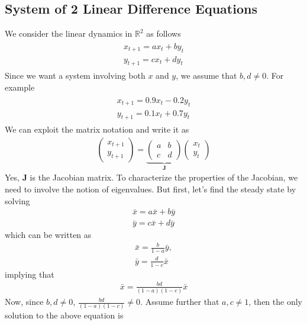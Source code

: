 \documentclass[11pt,a4paper]{book}
\theoremstyle{definition}\newtheorem{definition}{Definition}
\theoremstyle{definition}\newtheorem{fact}{Fact}
\theoremstyle{definition}\newtheorem{remark}{Remark}
\theoremstyle{definition}\newtheorem{ex}{Ex.}
\theoremstyle{definition}\newtheorem{project}{Project}
\theoremstyle{definition}\newtheorem{problem}{Problem}
\theoremstyle{definition}\newtheorem{example}{Example}
\numberwithin{theorem}{section}
\numberwithin{corollary}{chapter}
\numberwithin{assumption}{chapter}
\numberwithin{definition}{chapter}
\numberwithin{prop}{chapter}
\numberwithin{notation}{chapter}
\numberwithin{problem}{chapter}
\numberwithin{example}{chapter}
\numberwithin{fact}{chapter}
\numberwithin{ex}{chapter}
\def\R{\mathbb R}
\def\R{\mathbb R}
\def\J{\mathbf J}
\begin{document}
	
	\subsection{System of 2 Linear Difference Equations}
	We consider the linear dynamics in $\R^2$ as follows
	\begin{align}
		\begin{matrix}
			x_{t+1} = a x_t + b y_t \\
			y_{t+1} = c x_t + d y_t
		\end{matrix} \label{sys_lin}
	\end{align}
	Since we want a system involving both $x$ and $y$, we assume that $b, d \neq 0$. For example
	\begin{align}
		\begin{matrix}
			x_{t+1} = 0.9 x_t - 0.2 y_t \\
			y_{t+1} = 0.1 x_t + 0.7 y_t
		\end{matrix} \label{sys_lin_num}
	\end{align}
	We can exploit the matrix notation and write it as
	\begin{align}
		\begin{pmatrix}
			x_{t+1}  \\
			y_{t+1} 
		\end{pmatrix} =
		\underbrace{\begin{pmatrix}
			a & b \\ c & d
		\end{pmatrix}}_{\J}
		\begin{pmatrix}
			x_{t}  \\
			y_{t} 
		\end{pmatrix}
	\end{align}
	Yes, $\J$ is the Jacobian matrix. To characterize the properties of the Jacobian, we need to involve the notion of eigenvalues. But first, let's find the steady state by solving
	\begin{align*}
		\bar{x} = a \bar{x} + b \bar{y} \\
		\bar{y} = c \bar{x} + d \bar{y}
	\end{align*}
	which can be written as
	\begin{align*}
		\bar{x} = \frac{b}{1-a} \bar{y}, \\
		\bar{y} = \frac{d}{1-c} \bar{x}
	\end{align*}
	implying that
	\begin{align*}
		\bar{x} = \frac{bd}{(1-a)(1-c)} \bar{x}
	\end{align*}
	Now, since $b, d \neq 0$, $\frac{bd}{(1-a)(1-c)} \neq 0$. Assume further that $a, c \neq 1$, then the only solution to the above equation is
\end{document}
